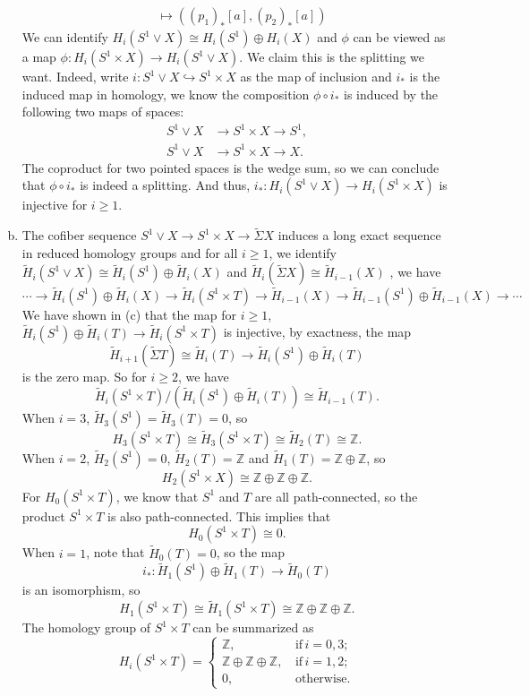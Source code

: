 \documentclass[a4paper, 12pt]{article}
\begin{document}
\begin{solution}
\begin{enumerate}[(a)]
\begin{align*}
         [a]&\mapsto ((p_1)_*[a],(p_2)_*[a])
\end{align*}
We can identify \(H_i(S^1\vee X)\cong H_i(S^1)\oplus H_i(X)\) and \(\phi\) can be viewed as a map \(\phi:H_i(S^1\times X)\rightarrow H_i(S^1\vee X)\). We claim this is the splitting we want. Indeed, 
write \(i:S^1\vee X\hookrightarrow S^1\times X\) as the map of inclusion and \(i_*\) is the induced map in homology, we know the composition \(\phi\circ i_*\) is induced by the following two maps of spaces:
\begin{align*}
S^1\vee X&\rightarrow S^1\times X\rightarrow S^1,\\ 
S^1\vee X&\rightarrow S^1\times X\rightarrow X.
\end{align*} 
The coproduct for two pointed spaces is the wedge sum, so we can conclude that \(\phi\circ i_*\) is indeed a splitting. And thus, \(i_*:H_i(S^1\vee X)\rightarrow H_i(S^1\times X)\) is injective for \(i\geq 1\). 
\item The cofiber sequence \(S^1\vee X\rightarrow S^1\times X\rightarrow \tilde{\Sigma}X\) induces a long exact sequence in reduced homology groups and for all \(i\geq 1\), we identify \(\tilde{H}_i(S^1\vee X)\cong \tilde{H}_i(S^1)\oplus \tilde{H}_i(X)\) 
and \(\tilde{H}_i(\tilde{\Sigma}X)\cong \tilde{H}_{i-1}(X)\) , we have 
\[\cdots\rightarrow \tilde{H}_i(S^1)\oplus \tilde{H}_i(X)\rightarrow \tilde{H}_i(S^1\times T)\rightarrow \tilde{H}_{i-1}(X)\rightarrow \tilde{H}_{i-1}(S^1)\oplus \tilde{H}_{i-1}(X)\rightarrow \cdots\]
We have shown in (c) that the map for \(i\geq 1\), \(\tilde{H}_i(S^1)\oplus \tilde{H}_i(T)\rightarrow \tilde{H}_i(S^1\times T)\) is injective, by exactness, the map 
\[\tilde{H}_{i+1}(\tilde{\Sigma}T)\cong \tilde{H}_i(T)\rightarrow \tilde{H}_i(S^1)\oplus \tilde{H}_i(T)\]
is the zero map. So for \(i\geq 2\), we have 
\[\tilde{H}_{i}(S^1\times T)/(\tilde{H}_{i}(S^1)\oplus \tilde{H}_{i}(T))\cong \tilde{H}_{i-1}(T).\]
When \(i=3\), \(\tilde{H}_3(S^1)=\tilde{H}_3(T)=0\), so 
\[H_3(S^1\times T)\cong \tilde{H}_3(S^1\times T)\cong \tilde{H}_2(T)\cong \mathbb{Z}.\]
When \(i=2\), \(\tilde{H}_2(S^1)=0\), \(\tilde{H}_2(T)=\mathbb{Z}\) and \(\tilde{H}_1(T)=\mathbb{Z}\oplus \mathbb{Z}\), so 
\[H_2(S^1\times X)\cong \mathbb{Z}\oplus \mathbb{Z}\oplus \mathbb{Z}.\]
For \(H_0(S^1\times T)\), we know that \(S^1\) and \(T\) are all path-connected, so the product \(S^1\times T\) is also path-connected. This implies that 
\[H_0(S^1\times T)\cong 0.\]
When \(i=1\), note that \(\tilde{H}_0(T)=0\), so the map 
\[i_*:\tilde{H}_1(S^1)\oplus \tilde{H}_1(T)\rightarrow \tilde{H}_0(T)\]
is an isomorphism, so 
\[H_1(S^1\times T)\cong \tilde{H}_1(S^1\times T)\cong \mathbb{Z}\oplus \mathbb{Z}\oplus \mathbb{Z}.\]
The homology group of \(S^1\times T\) can be summarized as 
\[H_i(S^1\times T)=\begin{cases}
    \mathbb{Z},&\, \text{if}\, i=0,3;\\ 
    \mathbb{Z}\oplus \mathbb{Z}\oplus \mathbb{Z},&\, \text{if}\, i=1,2;\\
    0,&\, \text{otherwise}.
\end{cases}\]


\end{enumerate}
\end{solution}
\end{document}
